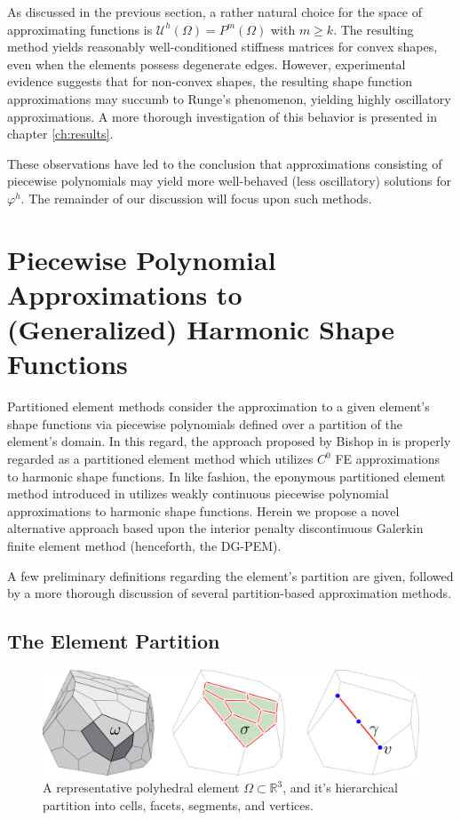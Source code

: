 	As discussed in the previous section, a rather natural choice for the space of approximating functions is $\mathcal{U}^h (\Omega) = P^{m} (\Omega)$ with $m \geq k$. The resulting method yields reasonably well-conditioned stiffness matrices for convex shapes, even when the elements possess degenerate edges. However, experimental evidence suggests that for non-convex shapes, the resulting shape function approximations may succumb to Runge's phenomenon, yielding highly oscillatory approximations. A more thorough investigation of this behavior is presented in chapter \ref{ch:results}.
	
	These observations have led to the conclusion that approximations consisting of piecewise polynomials may yield more well-behaved (less oscillatory) solutions for $\varphi^h$. The remainder of our discussion will focus upon such methods.
	
\section{Piecewise Polynomial Approximations to \\ (Generalized) Harmonic Shape Functions}

Partitioned element methods consider the approximation to a given element's shape functions via piecewise polynomials defined over a partition of the element's domain. In this regard, the approach proposed by Bishop in \cite{Bishop:14} is properly regarded as a partitioned element method which utilizes $C^0$ FE approximations to harmonic shape functions. In like fashion, the eponymous partitioned element method introduced in \cite{Rashid:12} utilizes weakly continuous piecewise polynomial approximations to harmonic shape functions. Herein we propose a novel alternative approach based upon the interior penalty discontinuous Galerkin finite element method (henceforth, the DG-PEM).

A few preliminary definitions regarding the element's partition are given, followed by a more thorough discussion of several partition-based approximation methods.

\subsection*{The Element Partition}

\begin{figure} [!ht]
	\centering
	\includegraphics[width = 6.0in]{figures/polyhedron_partition.pdf}
	\caption{A representative polyhedral element $\Omega \subset \mathbb{R}^3$, and it's hierarchical partition into cells, facets, segments, and vertices.}
	\label{fig:partitioned_element}
\end{figure}

